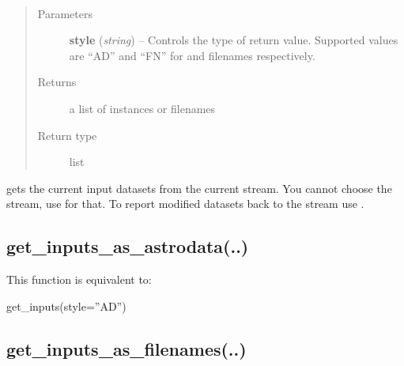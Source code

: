 \documentclass[letterpaper,10pt,english]{sphinxmanual}
\begin{document}
\begin{fulllineitems}
\label{chapter_ReductionContextClass:astrodata.RecipeManager.ReductionContext.get_inputs}~\begin{quote}\begin{description}
\item[{Parameters}] \leavevmode
\textbf{style} (\emph{string}) -- Controls the type of return value. Supported values are ``AD''
and ``FN'' for  and  filenames respectively.

\item[{Returns}] \leavevmode
a list of  instances or  filenames

\item[{Return type}] \leavevmode
list

\end{description}\end{quote}

 gets the current input datasets from the current stream. You cannot
choose the stream, use  for that.  To report modified
datasets back to the stream use .

\end{fulllineitems}



\subsection{get\_inputs\_as\_astrodata(..)}
\label{chapter_ReductionContextClass:get-inputs-as-astrodata}

\begin{fulllineitems}
\label{chapter_ReductionContextClass:astrodata.RecipeManager.ReductionContext.get_inputs_as_astrodata}
This function is equivalent to:

get\_inputs(style=''AD'')

\end{fulllineitems}



\subsection{get\_inputs\_as\_filenames(..)}
\label{chapter_ReductionContextClass:get-inputs-as-filenames}
\end{document}
